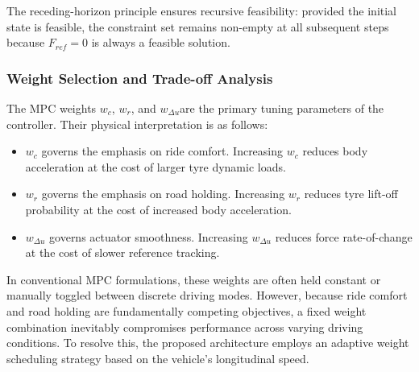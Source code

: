 The receding-horizon principle ensures recursive feasibility: provided
the initial state is feasible, the constraint set remains non-empty
at all subsequent steps because $F_{ref} = 0$ is always a feasible
solution.
\subsubsection{Weight Selection and Trade-off Analysis}\label{subsubsec:mpc_weights}The MPC weights $w_c$, $w_r$, and $w_{\Delta u}$are the primary tuning parameters of the controller. Their physical interpretation is as follows:\begin{itemize}\item $w_c$ governs the emphasis on ride comfort. Increasing $w_c$ reduces body acceleration at the cost of larger tyre dynamic loads.\item $w_r$ governs the emphasis on road holding. Increasing $w_r$ reduces tyre lift-off probability at the cost of increased body acceleration.\item $w_{\Delta u}$ governs actuator smoothness. Increasing $w_{\Delta u}$ reduces force rate-of-change at the cost of slower reference tracking.\end{itemize}In conventional MPC formulations, these weights are often held constant or manually toggled between discrete driving modes. However, because ride comfort and road holding are fundamentally competing objectives, a fixed weight combination inevitably compromises performance across varying driving conditions. To resolve this, the proposed architecture employs an adaptive weight scheduling strategy based on the vehicle's longitudinal speed.
